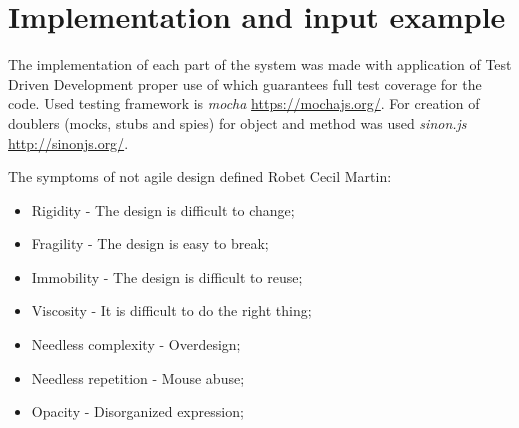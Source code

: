 \section{Implementation and input example}
The implementation of each part of the system was made with application of Test Driven Development proper use of which guarantees full test coverage for the code. Used testing framework is \textit{mocha} \url{https://mochajs.org/}. For creation of doublers (mocks, stubs and spies) for object and method was used \textit{sinon.js }\url{http://sinonjs.org/}.


The symptoms of not agile design defined Robet Cecil Martin\cite{MartinASD}:
\begin{itemize}
	\item Rigidity - The design is difficult to change;
	\item Fragility - The design is easy to break;
	\item Immobility - The design is difficult to reuse;
	\item Viscosity - It is difficult to do the right thing;
	\item Needless complexity - Overdesign;
	\item Needless repetition - Mouse abuse;
	\item Opacity - Disorganized expression;
\end{itemize}


